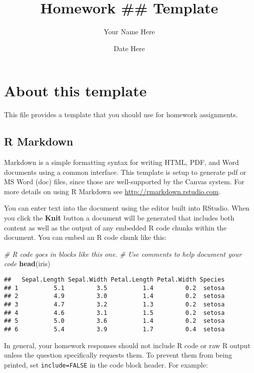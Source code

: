 \documentclass[]{article}
\title{Homework \#\# Template}
\author{Your Name Here}
\date{Date Here}
\newenvironment{Shaded}{\begin{snugshade}}{\end{snugshade}}
\newcommand{\KeywordTok}[1]{\textcolor[rgb]{0.13,0.29,0.53}{\textbf{#1}}}
\newcommand{\CommentTok}[1]{\textcolor[rgb]{0.56,0.35,0.01}{\textit{#1}}}
\newcommand{\NormalTok}[1]{#1}
\begin{document}
\maketitle

\section{About this template}\label{about-this-template}

This file provides a template that you should use for homework
assignments.

\subsection{R Markdown}\label{r-markdown}

Markdown is a simple formatting syntax for writing HTML, PDF, and Word
documents using a common interface. This template is setup to generate
pdf or MS Word (doc) files, since those are well-supported by the Canvas
system. For more details on using R Markdown see
\url{http://rmarkdown.rstudio.com}.

You can enter text into the document using the editor built into
RStudio. When you click the \textbf{Knit} button a document will be
generated that includes both content as well as the output of any
embedded R code chunks within the document. You can embed an R code
chunk like this:

\begin{Shaded}
\begin{Highlighting}[]
\CommentTok{# R code goes in blocks like this one.}
\CommentTok{# Use comments to help document your code}
\KeywordTok{head}\NormalTok{(iris)}
\end{Highlighting}
\end{Shaded}

\begin{verbatim}
##   Sepal.Length Sepal.Width Petal.Length Petal.Width Species
## 1          5.1         3.5          1.4         0.2  setosa
## 2          4.9         3.0          1.4         0.2  setosa
## 3          4.7         3.2          1.3         0.2  setosa
## 4          4.6         3.1          1.5         0.2  setosa
## 5          5.0         3.6          1.4         0.2  setosa
## 6          5.4         3.9          1.7         0.4  setosa
\end{verbatim}

In general, your homework responses should not include R code or raw R
output unless the question specifically requests them. To prevent them
from being printed, set \texttt{include=FALSE} in the code block header.
For example:
\end{document}
